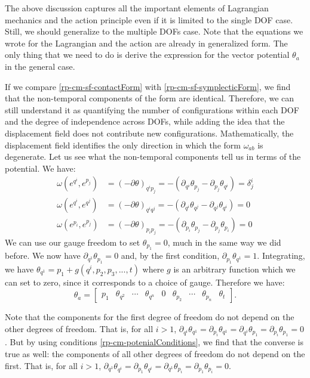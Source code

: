 The above discussion captures all the important elements of Lagrangian mechanics and the action principle even if it is limited to the single DOF case. Still, we should generalize to the multiple DOFs case. Note that the equations we wrote for the Lagrangian and the action are already in generalized form. The only thing that we need to do is derive the expression for the vector potential $\theta_a$ in the general case.

If we compare \ref{rp-cm-sf-contactForm} with \ref{rp-cm-sf-symplecticForm}, we find that the non-temporal components of the form are identical. Therefore, we can still understand it as quantifying the number of configurations within each DOF and the degree of independence across DOFs, while adding the idea that the displacement field does not contribute new configurations. Mathematically, the displacement field identifies the only direction in which the form $\omega_{ab}$ is degenerate. Let us see what the non-temporal components tell us in terms of the potential. We have:
\begin{equation}\label{rp-cm-potenialConditions}
	\begin{aligned}
		\omega(e^{q^i}, e^{p_j}) &= (-\partial\theta)_{q^i p_j} = -(\partial_{q^i}\theta_{p_j} - \partial_{p_j}\theta_{q^i}) = \delta^i_j \\
		\omega(e^{q^i}, e^{q^j}) &= (-\partial\theta)_{q^i q^j} = -(\partial_{q^i}\theta_{q^j} - \partial_{q^j}\theta_{q^i}) = 0 \\
		\omega(e^{p_i}, e^{p_j}) &= (-\partial\theta)_{p_i p_j} = -(\partial_{p_i}\theta_{p_j} - \partial_{p_j}\theta_{p_i}) = 0
	\end{aligned}
\end{equation}
We can use our gauge freedom to set $\theta_{p_1} = 0$, much in the same way we did before. We now have $\partial_{q^1} \theta_{p_1} = 0$ and, by the first condition, $\partial_{p_1} \theta_{q^1} = 1$. Integrating, we have $\theta_{q^1} = p_1 + g(q^i, p_2, p_3, ..., t)$ where $g$ is an arbitrary function which we can set to zero, since it corresponds to a choice of gauge. Therefore we have:
\begin{equation}
	\theta_a =  \begin{bmatrix}
		p_1 & \theta_{q^2} & \cdots & \theta_{q^n} & 0 & \theta_{p_2} & \cdots & \theta_{p_n} & \theta_{t}
	\end{bmatrix}. 
\end{equation}

Note that the components for the first degree of freedom do not depend on the other degrees of freedom. That is, for all $i>1$, $\partial_{q^i} \theta_{q^1} = \partial_{p_i} \theta_{q^1} = \partial_{q^i} \theta_{p_1} = \partial_{p_i} \theta_{p_1} = 0$. But by using conditions \ref{rp-cm-potenialConditions}, we find that the converse is true as well: the components of all other degrees of freedom do not depend on the first. That is, for all $i>1$, $\partial_{q^1} \theta_{q^i} = \partial_{p_1} \theta_{q^i} = \partial_{q^1} \theta_{p_i} = \partial_{p_1} \theta_{p_i} = 0$.

